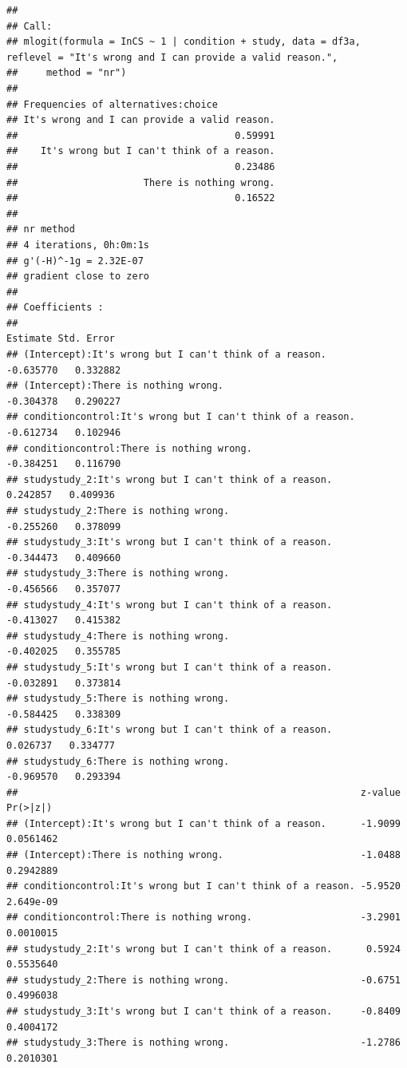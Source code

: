 \documentclass[
  american,
  man,floatsintext]{apa7}
\begin{document}
\begin{verbatim}
## 
## Call:
## mlogit(formula = InCS ~ 1 | condition + study, data = df3a, reflevel = "It's wrong and I can provide a valid reason.", 
##     method = "nr")
## 
## Frequencies of alternatives:choice
## It's wrong and I can provide a valid reason. 
##                                      0.59991 
##    It's wrong but I can't think of a reason. 
##                                      0.23486 
##                      There is nothing wrong. 
##                                      0.16522 
## 
## nr method
## 4 iterations, 0h:0m:1s 
## g'(-H)^-1g = 2.32E-07 
## gradient close to zero 
## 
## Coefficients :
##                                                             Estimate Std. Error
## (Intercept):It's wrong but I can't think of a reason.      -0.635770   0.332882
## (Intercept):There is nothing wrong.                        -0.304378   0.290227
## conditioncontrol:It's wrong but I can't think of a reason. -0.612734   0.102946
## conditioncontrol:There is nothing wrong.                   -0.384251   0.116790
## studystudy_2:It's wrong but I can't think of a reason.      0.242857   0.409936
## studystudy_2:There is nothing wrong.                       -0.255260   0.378099
## studystudy_3:It's wrong but I can't think of a reason.     -0.344473   0.409660
## studystudy_3:There is nothing wrong.                       -0.456566   0.357077
## studystudy_4:It's wrong but I can't think of a reason.     -0.413027   0.415382
## studystudy_4:There is nothing wrong.                       -0.402025   0.355785
## studystudy_5:It's wrong but I can't think of a reason.     -0.032891   0.373814
## studystudy_5:There is nothing wrong.                       -0.584425   0.338309
## studystudy_6:It's wrong but I can't think of a reason.      0.026737   0.334777
## studystudy_6:There is nothing wrong.                       -0.969570   0.293394
##                                                            z-value  Pr(>|z|)
## (Intercept):It's wrong but I can't think of a reason.      -1.9099 0.0561462
## (Intercept):There is nothing wrong.                        -1.0488 0.2942889
## conditioncontrol:It's wrong but I can't think of a reason. -5.9520 2.649e-09
## conditioncontrol:There is nothing wrong.                   -3.2901 0.0010015
## studystudy_2:It's wrong but I can't think of a reason.      0.5924 0.5535640
## studystudy_2:There is nothing wrong.                       -0.6751 0.4996038
## studystudy_3:It's wrong but I can't think of a reason.     -0.8409 0.4004172
## studystudy_3:There is nothing wrong.                       -1.2786 0.2010301

\end{verbatim}
\end{document}
